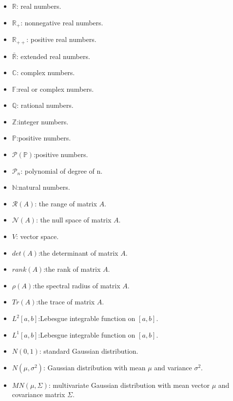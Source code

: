 \documentclass[oneside,hidelinks,12pt,letterpaper]{scrbook} %
\newcommand{\field}[1]  {\mathbb{#1}}
\newcommand{\R}{\mathbb{R}}
\newcommand{\RE}{\bar{\mathbb{R}}}
\newcommand{\F}{\mathbb{F}}
\newcommand{\PP}{\mathbb{P}}
\newcommand{\N}         {\field N}
\newcommand{\Z}         {\field Z}
\newcommand{\C}         {\field C}
\newcommand{\Q}         {\field Q}
\newcommand{\cP}{\mathcal{P}}
\newcommand{\cR}{\mathcal{R}}
\newcommand{\cN}{\mathcal{N}}
\theoremstyle{remark}
\theoremstyle{coloredRemark}
\theoremstyle{coloredNote}
\begin{document}
\begin{itemize}
	\item $\R$: real numbers.
	\item $\R_+$: nonnegative real numbers.
	\item $\R_{++}$: positive real numbers.
	\item $\RE$: extended real numbers.
	\item $\C$: complex numbers.
	\item $\F$:real or complex numbers.
	\item $\Q$: rational numbers.
	\item $\Z$:integer numbers.
	\item $\PP$:positive numbers.
	\item $\cP(\PP)$:positive numbers.
	\item $\cP_n$: polynomial of degree of n.
	\item $\N$:natural numbers.
	\item $\cR(A)$: the range of matrix $A$.
	\item $\cN(A)$: the null space of matrix $A$. 
		\item $V$: vector space.
		\item $det(A)$:the determinant of matrix $A$.
		\item $rank(A)$:the rank of matrix $A$.
		\item $\rho(A)$:the spectral radius of matrix $A$.
		\item $Tr(A)$:the trace of matrix $A$.	
		\item $L^2[a,b]$:Lebesgue integrable function on $[a,b]$.
		\item $L^1[a,b]$:Lebesgue integrable function on $[a,b]$.
		\item $N(0,1)$: standard Gaussian distribution.
		\item $N(\mu,\sigma^2)$: Gaussian distribution with mean $\mu$ and variance $\sigma^2$.
		\item $MN(\mu,\Sigma)$: multivariate Gaussian distribution with mean vector $\mu$ and covariance matrix $\Sigma$.
\end{itemize}



\newpage

\hypersetup{colorlinks=false}

\newpage

\listofalgorithms
\listoffigures
\listoftables

\dominitoc
\tableofcontents 
\end{document}

